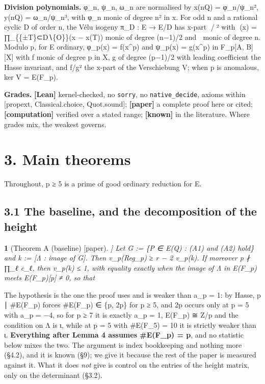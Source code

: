 \documentclass[11pt,a4paper]{article}
\theoremstyle{named}
\newtheorem*{namedthm}{}
\newcommand{\dispf}[1]{\par\smallskip{\centering #1\par}\smallskip}
\begin{document}
\textbf{Division polynomials.} φ\_n, ψ\_n, ω\_n are normalised by x(nQ) = φ\_n/ψ\_n², y(nQ) = ω\_n/ψ\_n³, with φ\_n monic of degree n² in x. For odd n and a rational cyclic D of order n, the Vélu isogeny π\_D : E → E/D has x-part /² with (x) = ∏\_\{\{±T\}⊂D∖\{O\}\}(x − x(T)) monic of degree (n−1)/2 and  monic of degree n. Modulo p, for E ordinary, φ\_p(x) = f(x\textasciicircum{}p) and ψ\_p(x) = g(x\textasciicircum{}p) in F\_p[A, B][X] with f monic of degree p in X, g of degree (p−1)/2 with leading coefficient the Hasse invariant, and f/g² the x-part of the Verschiebung V; when p is anomalous, ker V = E(F\_p).

\textbf{Grades.} \textbf{[Lean]} kernel-checked, no \texttt{sorry}, no \texttt{native\_\allowbreak{}decide}, axioms within [propext, Classical.choice, Quot.sound]; \textbf{[paper]} a complete proof here or cited; \textbf{[computation]} verified over a stated range; \textbf{[known]} in the literature. Where grades mix, the weakest governs.

\section*{3. Main theorems}

Throughout, p ≥ 5 is a prime of good ordinary reduction for E.

\subsection*{3.1 The baseline, and the decomposition of the height}

\begin{namedthm}[Theorem A (baseline) [paper]]
Let G := \{P ∈ E(Q) : (A1) and (A2) hold\} and k := [Λ : image of G]. Then v\_p(Reg\_p) ≥ r − 2 v\_p(k). If moreover p ∤ ∏\_ℓ c\_ℓ, then v\_p(k) ≤ 1, with equality exactly when the image of Λ in E(F\_p) meets E(F\_p)[p] ≠ 0, so that
\dispf{v\_p(Reg\_p) ≥ r − 2 in that case,  v\_p(Reg\_p) ≥ r otherwise.}
\end{namedthm}

The hypothesis is the one the proof uses and is weaker than a\_p = 1: by Hasse, p ∣ \#E(F\_p) forces \#E(F\_p) ∈ \{p, 2p\} for p ≥ 5, and 2p occurs only at p = 5 with a\_p = −4, so for p ≥ 7 it is exactly a\_p = 1, E(F\_p) ≅ Z/p and the condition on Λ is ι, while at p = 5 with \#E(F\_5) = 10 it is strictly weaker than ι. \textbf{Everything after Lemma 4 assumes \#E(F\_p) = p}, and no statistic below mixes the two. The argument is index bookkeeping and nothing more (§4.2), and it is known (§9); we give it because the rest of the paper is measured against it. What it does \textit{not} give is control on the entries of the height matrix, only on the determinant (§3.2).
\end{document}
